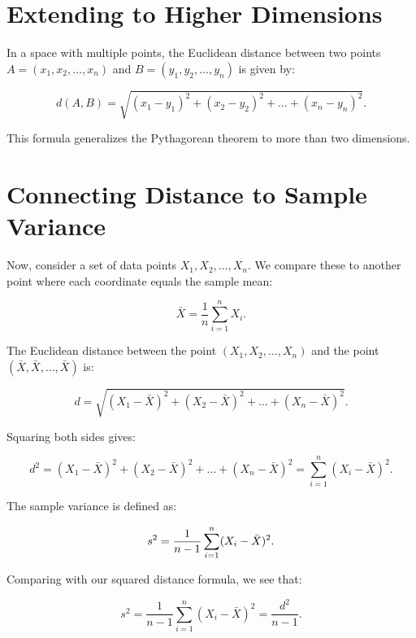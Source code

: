 \documentclass{article}
\begin{document}
\section{Extending to Higher Dimensions}

In a space with multiple points, the Euclidean distance between two points \(A = (x_1, x_2, \dots, x_n)\) and \(B = (y_1, y_2, \dots, y_n)\) is given by:

\begin{equation}
    d(A, B) = \sqrt{(x_1 - y_1)^2 + (x_2 - y_2)^2 + \dots + (x_n - y_n)^2}.
\end{equation}

This formula generalizes the Pythagorean theorem to more than two dimensions.

\section{Connecting Distance to Sample Variance}

Now, consider a set of data points \(X_1, X_2, \dots, X_n\). We compare these to another point where each coordinate equals the sample mean:

\begin{equation}
    \bar{X} = \frac{1}{n} \sum_{i=1}^{n} X_i.
\end{equation}

The Euclidean distance between the point \((X_1, X_2, \dots, X_n)\) and the point \((\bar{X}, \bar{X}, \dots, \bar{X})\) is:

\begin{equation}
    d = \sqrt{(X_1 - \bar{X})^2 + (X_2 - \bar{X})^2 + \dots + (X_n - \bar{X})^2}.
\end{equation}

Squaring both sides gives:

\begin{equation}
    d^2 = (X_1 - \bar{X})^2 + (X_2 - \bar{X})^2 + \dots + (X_n - \bar{X})^2 = \sum_{i=1}^{n} (X_i - \bar{X})^2.
\end{equation}

The sample variance is defined as:

\begin{equation}
    s^2 = \frac{1}{n-1} \sum_{i=1}^{n} (X_i - \bar{X})^2. \\ 
\end{equation}

Comparing with our squared distance formula, we see that:

\begin{equation}
    s^2 = \frac{1}{n-1} \sum_{i=1}^{n} (X_i - \bar{X})^2 =  \frac{d^2}{n-1}.
\end{equation}
\end{document}
